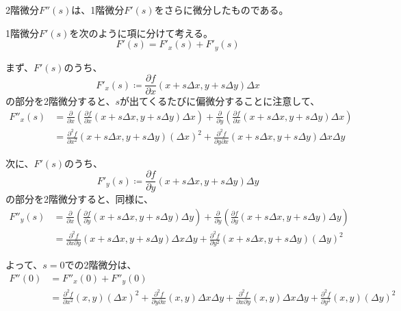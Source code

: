 \documentclass[../../../topic_calculus]{subfiles}
\begin{document}
\br

2階微分$F''(s)$は、1階微分$F'(s)$をさらに微分したものである。

1階微分$F'(s)$を次のように項に分けて考える。
\begin{equation*}
  F'(s) = F'_x(s) + F'_y(s)
\end{equation*}

まず、$F'(s)$のうち、
\begin{equation*}
  F'_x(s) \coloneqq \frac{\partial f}{\partial x}(x + s\Delta x, y + s\Delta y)\Delta x
\end{equation*}
の部分を2階微分すると、$s$が出てくるたびに偏微分することに注意して、
\begin{align*}
  F''_x(s) &= \frac{\partial}{\partial x}\left(\frac{\partial f}{\partial x}(x + s\Delta x, y + s\Delta y)\Delta x\right) + \frac{\partial}{\partial y}\left(\frac{\partial f}{\partial x}(x + s\Delta x, y + s\Delta y)\Delta x\right) \\
  &= \frac{\partial^2 f}{\partial x^2}(x + s\Delta x, y + s\Delta y)(\Delta x)^2 + \frac{\partial^2 f}{\partial y \partial x}(x + s\Delta x, y + s\Delta y)\Delta x \Delta y
\end{align*}

次に、$F'(s)$のうち、
\begin{equation*}
  F'_y(s) \coloneqq \frac{\partial f}{\partial y}(x + s\Delta x, y + s\Delta y)\Delta y
\end{equation*}
の部分を2階微分すると、同様に、
\begin{align*}
  F''_y(s) &= \frac{\partial}{\partial x}\left(\frac{\partial f}{\partial y}(x + s\Delta x, y + s\Delta y)\Delta y\right) + \frac{\partial}{\partial y}\left(\frac{\partial f}{\partial y}(x + s\Delta x, y + s\Delta y)\Delta y\right) \\
  &= \frac{\partial^2 f}{\partial x \partial y}(x + s\Delta x, y + s\Delta y)\Delta x \Delta y + \frac{\partial^2 f}{\partial y^2}(x + s\Delta x, y + s\Delta y)(\Delta y)^2
\end{align*}

よって、$s = 0$での2階微分は、
\begin{align*}
  F''(0) &= F''_x(0) + F''_y(0) \\
  &= \frac{\partial^2 f}{\partial x^2}(x, y)(\Delta x)^2 + \frac{\partial^2 f}{\partial y \partial x}(x, y)\Delta x \Delta y + \frac{\partial^2 f}{\partial x \partial y}(x, y)\Delta x \Delta y + \frac{\partial^2 f}{\partial y^2}(x, y)(\Delta y)^2
\end{align*}
\end{document}
